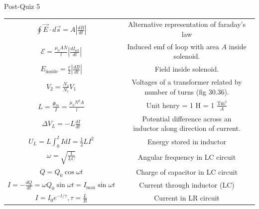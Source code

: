 \documentclass{article}
\begin{document}
\begin{section}{Post-Quiz 5}
\begin{tabular}{|c|c|}
	 $\oint \vec E \cdot d \vec s = A | \frac{dB}{dt} | $                          & Alternative representation of faraday's law              \\

	 $\mathcal E = \frac{\mu_0 A N}{l} | \frac{d I_\text{sol}}{dt} | $             & Induced emf of loop with area $A$ inside solenoid.       \\

	 $E_\text{inside} = \frac{r}{2} | \frac{dB}{dt} |$                             & Field inside solenoid.                                   \\

	 $V_2 = \frac{N_2}{N_1} V_1$                                                   & \makecell{Voltages of a transformer related by           \\ number of turns (fig 30.36).} \\

	 $L = \frac{\Phi_m}{I} = \frac{\mu_0 N^2 A}{l}$                                & Unit henry = 1 H = 1 $\frac{\text{Tm}^2}{A}$             \\

	 $\Delta V_L = -L \frac{dI}{dt}$                                               & \makecell{Potential difference across an                 \\
	 inductor along direction of current.}                                                                                                    \\

	 $U_L = L \int_0^I I dI = \frac{1}{2} L I^2$                                   & Energy stored in inductor                                \\

	 $\omega = \sqrt{\frac{1}{LC}}$                                                & Angular frequency in LC circuit                          \\

	 $Q = Q_0 \cos \omega t$                                                       & Charge of capacitor in LC circuit                        \\

	 $I = - \frac{dQ}{dt} = \omega Q_0 \sin \omega t = I_\text{max} \sin \omega t$ & Current through inductor (LC)                            \\

	 $I = I_0 e^{-t / \tau}, \tau = \frac{L}{R}$                                   & Current in LR circuit                                    \\


\end{tabular}
\end{section}
\end{document}
